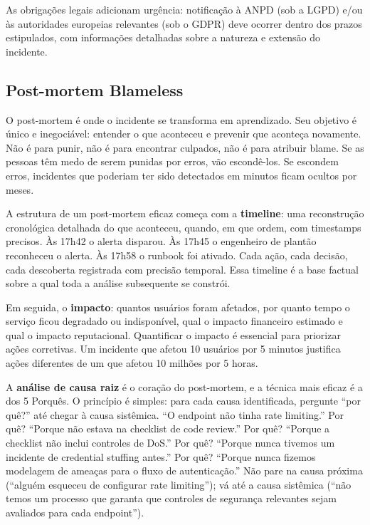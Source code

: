 As obrigações legais adicionam urgência: notificação à ANPD (sob a LGPD) e/ou
às autoridades europeias relevantes (sob o GDPR) deve ocorrer dentro dos prazos
estipulados, com informações detalhadas sobre a natureza e extensão do incidente.

\subsection{Post-mortem Blameless}

O post-mortem é onde o incidente se transforma em aprendizado. Seu objetivo é
único e inegociável: entender o que aconteceu e prevenir que aconteça novamente.
Não é para punir, não é para encontrar culpados, não é para atribuir blame. Se
as pessoas têm medo de serem punidas por erros, vão escondê-los. Se escondem
erros, incidentes que poderiam ter sido detectados em minutos ficam ocultos por
meses.

A estrutura de um post-mortem eficaz começa com a \textbf{timeline}: uma
reconstrução cronológica detalhada do que aconteceu, quando, em que ordem, com
timestamps precisos. Às 17h42 o alerta disparou. Às 17h45 o engenheiro de
plantão reconheceu o alerta. Às 17h58 o runbook foi ativado. Cada ação, cada
decisão, cada descoberta registrada com precisão temporal. Essa timeline é a
base factual sobre a qual toda a análise subsequente se constrói.

Em seguida, o \textbf{impacto}: quantos usuários foram afetados, por quanto
tempo o serviço ficou degradado ou indisponível, qual o impacto financeiro
estimado e qual o impacto reputacional. Quantificar o impacto é essencial para
priorizar ações corretivas. Um incidente que afetou 10 usuários por 5
minutos justifica ações diferentes de um que afetou 10 milhões por 5 horas.

A \textbf{análise de causa raiz} é o coração do post-mortem, e a técnica mais
eficaz é a dos 5 Porquês. O princípio é simples: para cada causa identificada,
pergunte ``por quê?'' até chegar à causa sistêmica. ``O endpoint não tinha rate
limiting.'' Por quê? ``Porque não estava na checklist de code review.''
Por quê? ``Porque a checklist não inclui controles de DoS.'' Por quê? ``Porque
nunca tivemos um incidente de credential stuffing antes.'' Por quê? ``Porque
nunca fizemos modelagem de ameaças para o fluxo de autenticação.'' Não pare na
causa próxima (``alguém esqueceu de configurar rate limiting''); vá até a causa
sistêmica (``não temos um processo que garanta que controles de segurança
relevantes sejam avaliados para cada endpoint'').

